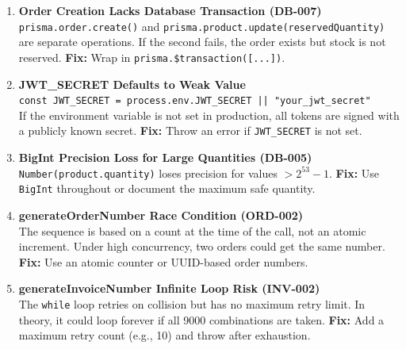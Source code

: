 \documentclass[12pt,onecolumn]{IEEEtran}
\begin{document}

\begin{tcolorbox}[criticalbox, title={Critical Risks Identified During White Box Analysis}]
\begin{enumerate}
  \item \textbf{Order Creation Lacks Database Transaction (DB-007)} \\
  \texttt{prisma.order.create()} and \texttt{prisma.product.update(reservedQuantity)} are
  separate operations. If the second fails, the order exists but stock is not reserved.
  \textbf{Fix:} Wrap in \texttt{prisma.\$transaction([...])}.

  \item \textbf{JWT\_SECRET Defaults to Weak Value} \\
  \texttt{const JWT\_SECRET = process.env.JWT\_SECRET || "your\_jwt\_secret"} \\
  If the environment variable is not set in production, all tokens are signed with a
  publicly known secret. \textbf{Fix:} Throw an error if \texttt{JWT\_SECRET} is not set.

  \item \textbf{BigInt Precision Loss for Large Quantities (DB-005)} \\
  \texttt{Number(product.quantity)} loses precision for values $> 2^{53} - 1$.
  \textbf{Fix:} Use \texttt{BigInt} throughout or document the maximum safe quantity.

  \item \textbf{generateOrderNumber Race Condition (ORD-002)} \\
  The sequence is based on a count at the time of the call, not an atomic increment.
  Under high concurrency, two orders could get the same number.
  \textbf{Fix:} Use an atomic counter or UUID-based order numbers.

  \item \textbf{generateInvoiceNumber Infinite Loop Risk (INV-002)} \\
  The \texttt{while} loop retries on collision but has no maximum retry limit.
  In theory, it could loop forever if all 9000 combinations are taken.
  \textbf{Fix:} Add a maximum retry count (e.g., 10) and throw after exhaustion.
\end{enumerate}
\end{tcolorbox}

\end{document}
